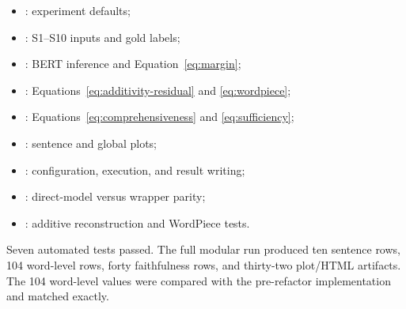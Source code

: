 \documentclass[11pt,a4paper]{article}
\begin{document}
\begin{itemize}
  \item {}: experiment defaults;
  \item {}: S1--S10 inputs and gold labels;
  \item {}: BERT inference and Equation~\eqref{eq:margin};
  \item {}: Equations~\eqref{eq:additivity-residual}
        and \eqref{eq:wordpiece};
  \item {}: Equations~\eqref{eq:comprehensiveness}
        and \eqref{eq:sufficiency};
  \item {}: sentence and global plots;
  \item {}: configuration, execution, and result writing;
  \item {}: direct-model versus wrapper parity;
  \item {}: additive reconstruction and WordPiece tests.
\end{itemize}

Seven automated tests passed. The full modular run produced ten sentence rows,
104 word-level rows, forty faithfulness rows, and thirty-two plot/HTML artifacts.
The 104 word-level values were compared with the pre-refactor implementation and
matched exactly.
\end{document}

